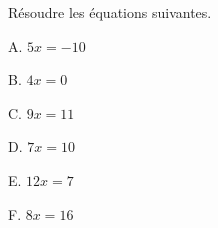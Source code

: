 
Résoudre les équations suivantes.

\begin{description}
\begin{minipage}{0.33\linewidth}
\item[A.] $5x = -10$ 
\item[B.] $4x = 0$
\end{minipage}
\begin{minipage}{0.33\linewidth}
\item[C.] $9x = 11$
\item[D.] $7x = 10$
\end{minipage}
\begin{minipage}{0.33\linewidth}
\item[E.] $12x = 7$
\item[F.] $8x= 16$
\end{minipage}
\end{description}